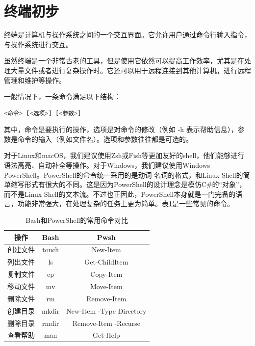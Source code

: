 \documentclass[../main.tex]{subfiles}
\begin{document}
\section{终端初步}\label{sec:terminal}

终端是计算机与操作系统之间的一个交互界面。它允许用户通过命令行输入指令，与操作系统进行交互。

虽然终端是一个非常古老的工具，但是使用它依然可以提高工作效率，尤其是在处理大量文件或者进行复杂操作时。它还可以用于远程连接到其他计算机，进行远程管理和维护等操作。

一般情况下，一条命令满足以下结构：
\begin{lstlisting}[language=bash]
    <命令> [<选项>] [<参数>]
\end{lstlisting}

其中，命令是要执行的操作，选项是对命令的修改（例如 -h 表示帮助信息），参数是命令的输入（例如文件名）。选项和参数往往都是可选的。

对于Linux和macOS，我们建议使用Zsh或Fish等更加友好的shell，他们能够进行语法高亮、自动补全等操作。对于Windows，我们建议使用Windows PowerShell。PowerShell的命令统一采用的是动词-名词的格式，和Linux Shell的简单缩写形式有很大的不同。这是因为PowerShell的设计理念是模仿C\#的“对象”，而不是Linux Shell的文本流。不过也正因此，PowerShell本身就是一门完备的语言，功能非常强大，在处理复杂的任务上更为简单。表\ref{tab:terminal-commands}是一些常见的命令。

\begin{table}[htbp]
    \centering
    \begin{tabular}{c|cc}
        \hline
        \textbf{操作} & \textbf{Bash} & \textbf{Pwsh} \\
        \hline
        创建文件 & touch & New-Item \\
        列出文件 & ls & Get-ChildItem \\
        复制文件 & cp & Copy-Item \\
        移动文件 & mv & Move-Item \\
        删除文件 & rm & Remove-Item \\
        创建目录 & mkdir & New-Item -Type Directory \\
        删除目录 & rmdir & Remove-Item -Recurse \\
        查看帮助 & man & Get-Help \\
        \hline
    \end{tabular}
    \caption{Bash和PowerShell的常用命令对比}
    \label{tab:terminal-commands}
\end{table}
\end{document}
